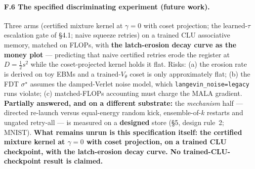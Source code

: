 \documentclass[11pt]{article}
\newcommand{\half}{\tfrac12}
\begin{document}
\paragraph{F.6 The specified discriminating experiment (future work).} Three arms (certified mixture kernel at $\gamma=0$ with coset projection; the learned-$\tau$ escalation gate of \S4.1; naive squeeze retries) on a trained CLU associative memory, matched on FLOPs, with \textbf{the latch-erosion decay curve as the money plot} --- predicting that naive certified retries erode the register at $D=\half s^2$ while the coset-projected kernel holds it flat. Risks: (a) the erosion rate is derived on toy EBMs and a trained-$V_\theta$ coset is only approximately flat; (b) the FDT $\sigma^\star$ assumes the damped-Verlet noise model, which \texttt{langevin\_noise=legacy} runs violate; (c) matched-FLOPs accounting must charge the MALA gradient. \textbf{Partially answered, and on a different substrate:} the \emph{mechanism} half --- directed re-launch versus equal-energy random kick, ensemble-of-$k$ restarts and ungated retry-all --- is measured on a \textbf{designed} store (\S5, design rule~2; MNIST). \textbf{What remains unrun is this specification itself: the certified mixture kernel at $\gamma=0$ with coset projection, on a trained CLU checkpoint, with the latch-erosion decay curve. No trained-CLU-checkpoint result is claimed.}
\end{document}
